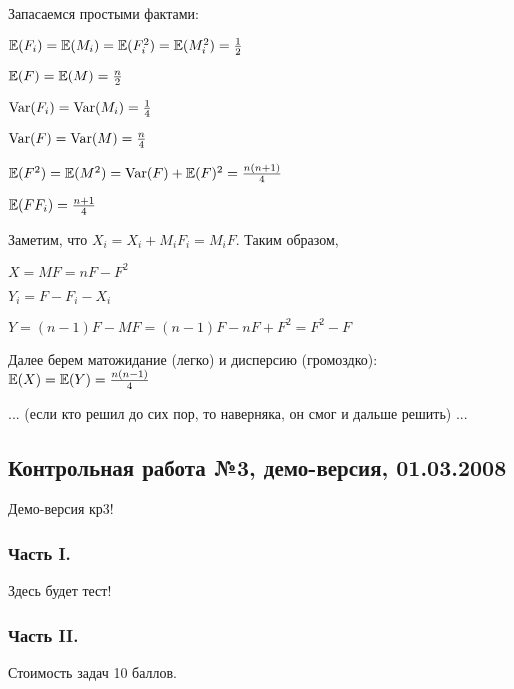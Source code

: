 \begin{enumerate}
Запасаемся простыми фактами:

$\mathbb{E}(F_{i})=\mathbb{E}(M_{i})=\mathbb{E}(F_{i}^{2})=\mathbb{E}(M_{i}^{2})=\frac{1}{2}$

$\mathbb{E}(F)=\mathbb{E}(M)=\frac{n}{2}$

$\operatorname{Var}(F_{i})=\operatorname{Var}(M_{i})=\frac{1}{4}$

$\operatorname{Var}(F)=\operatorname{Var}(M)=\frac{n}{4}$

$\mathbb{E}(F^{2})=\mathbb{E}(M^{2})=\operatorname{Var}(F)+\mathbb{E}(F)^{2}=\frac{n(n+1)}{4}$

$\mathbb{E}(FF_{i})=\frac{n+1}{4}$

Заметим, что $X_{i}=X_{i}+M_{i}F_{i}=M_{i}F$. Таким образом,

$X=MF=nF-F^{2}$

$Y_{i}=F-F_{i}-X_{i}$

$Y=(n-1)F-MF=(n-1)F-nF+F^{2}=F^{2}-F$

Далее берем матожидание (легко) и дисперсию (громоздко):  $\mathbb{E}(X)=\mathbb{E}(Y)=\frac{n(n-1)}{4}$

... (если кто решил до сих пор, то наверняка, он смог и дальше решить) ...
\end{enumerate}



\subsection{Контрольная работа №3, демо-версия, 01.03.2008}

Демо-версия кр3!
\subsubsection*{Часть I.} Здесь будет тест!
\subsubsection*{Часть II.}

Стоимость задач 10 баллов.

